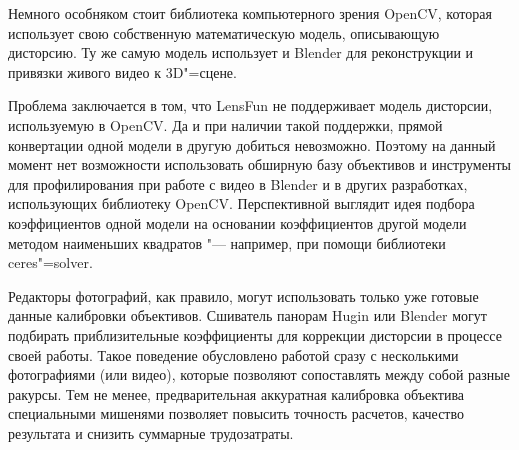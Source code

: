 \documentclass[10pt, a5paper]{article}
\begin{document}
Немного особняком стоит библиотека компьютерного зрения \linebreak OpenCV, которая использует свою собственную математическую модель, описывающую дисторсию. Ту же самую модель использует и Blender для реконструкции и привязки живого видео к 3D"=сцене.

Проблема заключается в том, что LensFun не поддерживает модель дисторсии, используемую в OpenCV. Да и при наличии такой поддержки, прямой конвертации одной модели в другую добиться невозможно. Поэтому на данный момент нет возможности использовать обширную базу объективов и инструменты для профилирования при работе с видео в Blender и в других разработках, использующих библиотеку OpenCV. Перспективной выглядит идея подбора коэффициентов одной модели на основании коэффициентов другой модели методом наименьших квадратов "--- например, при помощи библиотеки ceres"=solver.

Редакторы фотографий, как правило, могут использовать только уже готовые данные калибровки объективов. Сшиватель панорам Hugin или Blender могут подбирать приблизительные коэффициенты для коррекции дисторсии в процессе своей работы. Такое поведение обусловлено работой сразу с несколькими фотографиями (или видео), которые позволяют сопоставлять между собой разные ракурсы. Тем не менее, предварительная аккуратная калибровка объектива специальными мишенями позволяет повысить точность расчетов, качество результата и снизить суммарные трудозатраты.
\end{document}
